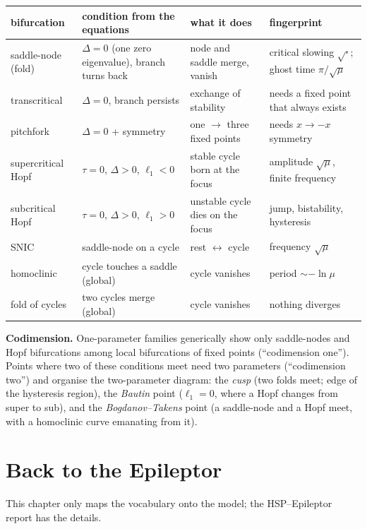 \documentclass[11pt,openany]{report}
\begin{document}
\begin{center}\small
\begin{tabular}{>{\raggedright}p{3.0cm}>{\raggedright}p{4.0cm}>{\raggedright}p{3.8cm}p{3.6cm}}
\toprule
bifurcation & condition from the equations & what it does & fingerprint \\
\midrule
saddle-node (fold) & $\Delta=0$ (one zero eigenvalue), branch turns back & node and saddle merge, vanish & critical slowing $\sqrt{\cdot}$; ghost time $\pi/\sqrt\mu$ \\
transcritical & $\Delta=0$, branch persists & exchange of stability & needs a fixed point that always exists \\
pitchfork & $\Delta=0$ + symmetry & one $\to$ three fixed points & needs $x\to-x$ symmetry \\
supercritical Hopf & $\tau=0$, $\Delta>0$, $\ell_1<0$ & stable cycle born at the focus & amplitude $\sqrt\mu$, finite frequency \\
subcritical Hopf & $\tau=0$, $\Delta>0$, $\ell_1>0$ & unstable cycle dies on the focus & jump, bistability, hysteresis \\
SNIC & saddle-node on a cycle & rest $\leftrightarrow$ cycle & frequency $\sqrt\mu$ \\
homoclinic & cycle touches a saddle (global) & cycle vanishes & period $\sim -\ln\mu$ \\
fold of cycles & two cycles merge (global) & cycle vanishes & nothing diverges \\
\bottomrule
\end{tabular}
\end{center}

\textbf{Codimension.} One-parameter families generically show only saddle-nodes and Hopf bifurcations among
local bifurcations of fixed points (``codimension one''). Points where two of these conditions meet need two
parameters (``codimension two'') and organise the two-parameter diagram: the \emph{cusp} (two folds meet; edge of the
hysteresis region), the \emph{Bautin} point ($\ell_1 = 0$, where a Hopf changes from super to sub), and the
\emph{Bogdanov--Takens} point (a saddle-node and a Hopf meet, with a homoclinic curve emanating from it).

\chapter{Back to the Epileptor}
This chapter only maps the vocabulary onto the model; the HSP--Epileptor report has the details.
\end{document}
